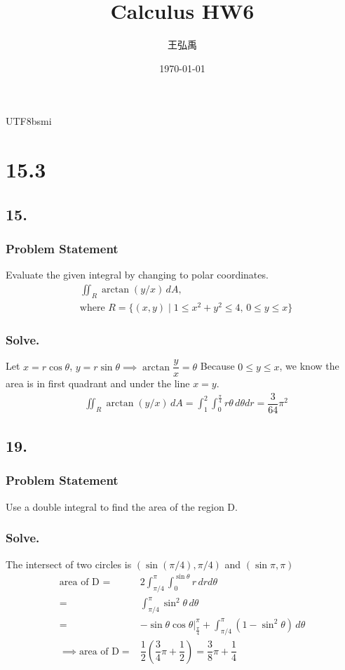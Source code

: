 \documentclass[12pt, a4paper]{article}
\title{\textbf{Calculus HW6}}
\author{王弘禹}
\date\today
\begin{document}
\begin{CJK*}{UTF8}{bsmi}
\linespread{1.5}
\maketitle
\newcommand{\st}[1]{\section*{#1}}
\newcommand{\sst}[1]{\subsection*{#1}}
\newcommand{\ssst}[1]{\subsubsection*{#1}}
\newcommand{\dsp}{\displaystyle}
\newcommand{\dx}{\,dx}
\newcommand{\dphi}{\,d\phi}
\newcommand{\dtheta}{\,d\theta}
\newcommand{\dy}{\,dy}
\newcommand{\dz}{\,dz}
\newcommand{\dr}{\,dr}
\st{15.3}
\sst{15.}
\ssst{\textbf{Problem Statement}}
Evaluate the given integral by changing to polar coordinates.
\begin{align}
    &\iint_R \arctan{(y/x)}\,dA,\\
    &\text{where } R =\{(x,y)\mid 1\le x^2+y^2\le4,\,0\le y \le x\} 
\end{align}
\ssst{\textbf{Solve.}}
Let $x=r\cos \theta$, $y=r\sin \theta \implies \arctan{\dfrac{y}{x}}=\theta$
Because $0\le y\le x$, we know the area is in first quadrant and under the line $x=y$.
\begin{align}
    &\iint_R \arctan{(y/x)}\,dA = \int_1^2\int_0^{\frac{\pi}{4}}r\theta \dtheta dr=\dfrac{3}{64}\pi^2
\end{align}
\sst{19.}
\ssst{\textbf{Problem Statement}}
Use a double integral to find the area of the region D.
\ssst{\textbf{Solve.}}
The intersect of two circles is $(\sin {(\pi/4)},\pi/4)$ and $(\sin \pi,\pi)$
\begin{align}
    \text{area of D } = &2 \int_{\pi/4}^{\pi} \int_0^{\sin\theta}r\dr d\theta\\
    =& \int_{\pi/4}^{\pi}\sin^2\theta \dtheta\\
    =&-\sin\theta \cos \theta\Big|_{\frac{\pi}{4}}^{\pi}+\int_{\pi/4}^{\pi}(1-\sin^2 \theta)\dtheta\\
    \implies \text{area of D} =&\dfrac{1}{2}(\dfrac{3}{4}\pi+\dfrac{1}{2})=\dfrac{3}{8}\pi+\dfrac{1}{4}
\end{align}


\end{CJK*}
\end{document}
